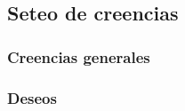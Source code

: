 \subsection{Seteo de creencias}
  \label{sec:seteo_de_creencias}
  
  
\subsubsection{Creencias generales}
  \label{sec:creencias_generales}
  
  
\subsubsection{Deseos}
  \label{sec:deseos}
  
  
